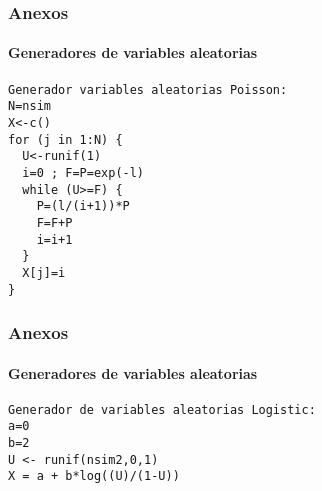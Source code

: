 \documentclass[12pt]{beamer}
\begin{document}
\begin{frame}[fragile]
\frametitle{Anexos}
\framesubtitle{Generadores de variables aleatorias}
\begin{verbatim}
Generador variables aleatorias Poisson:
N=nsim
X<-c()
for (j in 1:N) {
  U<-runif(1)
  i=0 ; F=P=exp(-l)
  while (U>=F) {
    P=(l/(i+1))*P
    F=F+P
    i=i+1
  }
  X[j]=i
}
\end{verbatim}
\end{frame}
\begin{frame}[fragile]
\frametitle{Anexos}
\framesubtitle{Generadores de variables aleatorias}
\begin{verbatim}
Generador de variables aleatorias Logistic:
a=0
b=2
U <- runif(nsim2,0,1)
X = a + b*log((U)/(1-U))
\end{verbatim}
\end{frame}
\end{document}
